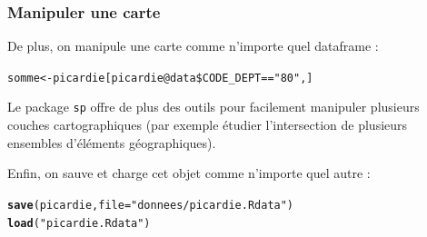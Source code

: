 \documentclass[slidetop, 10pt]{beamer}\usepackage{graphicx, color}
\makeatletter
\newcommand{\hlfunctioncall}[1]{\textcolor[rgb]{0.501960784313725,0,0.329411764705882}{\textbf{#1}}}%
\newcommand{\hlstring}[1]{\textcolor[rgb]{0.6,0.6,1}{#1}}%
\newenvironment{kframe}{%
 \def\at@end@of@kframe{}%
 \ifinner\ifhmode%
  \def\at@end@of@kframe{\end{minipage}}%
  \begin{minipage}{\columnwidth}%
 \fi\fi%
 \def\FrameCommand##1{\hskip\@totalleftmargin \hskip-\fboxsep
 \colorbox{shadecolor}{##1}\hskip-\fboxsep
     \hskip-\linewidth \hskip-\@totalleftmargin \hskip\columnwidth}%
 \MakeFramed {\advance\hsize-\width
   \@totalleftmargin\z@ \linewidth\hsize
   \@setminipage}}%
 {\par\unskip\endMakeFramed%
 \at@end@of@kframe}
\newenvironment{knitrout}{}{} %
\renewenvironment{knitrout}{\begin{tiny}}{\end{tiny}}
\makeatother
\begin{document}
\begin{frame}[fragile]
\frametitle{Manipuler une carte}
De plus, on manipule une carte comme n'importe quel dataframe :

\begin{knitrout}\tiny
{}\color{fgcolor}\begin{kframe}
\begin{alltt}
somme <- picardie[picardie@data\$CODE_DEPT == \hlstring{"80"}, ]
\end{alltt}
\end{kframe}
\end{knitrout}


Le package \verb!sp! offre de plus des outils pour facilement manipuler plusieurs couches cartographiques (par exemple étudier l'intersection de plusieurs ensembles d'éléments géographiques).

Enfin, on sauve et charge cet objet comme n'importe quel autre :

\begin{knitrout}\tiny
{}\color{fgcolor}\begin{kframe}
\begin{alltt}
\hlfunctioncall{save}(picardie, file = \hlstring{"donnees/picardie.Rdata"})
\hlfunctioncall{load}(\hlstring{"picardie.Rdata"})
\end{alltt}
\end{kframe}
\end{knitrout}


\end{frame}
\end{document}
